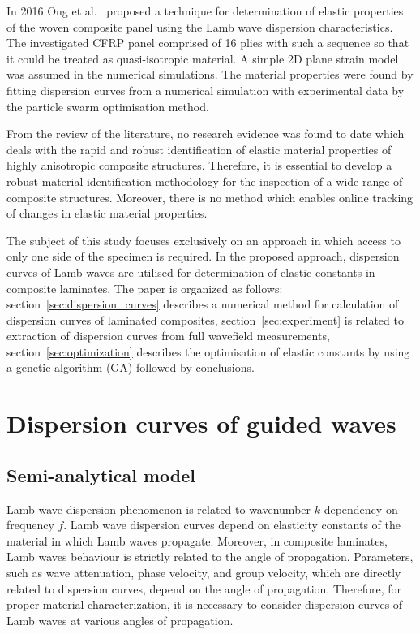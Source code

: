 	In 2016 Ong et al.~\cite{Ong2016} proposed a technique for determination of elastic properties of the woven composite panel using the Lamb wave dispersion characteristics. The investigated CFRP panel comprised of 16 plies with such a sequence so that it could be treated as quasi-isotropic material. A simple 2D plane strain model was assumed in the numerical simulations. The material properties were found by fitting dispersion curves from a numerical simulation with experimental data by the particle swarm optimisation method. 
	
	From the review of the literature, no research evidence was found to date which deals with the rapid and robust identification of elastic material properties of highly anisotropic composite structures. Therefore, it is essential to develop a robust material identification methodology for the inspection of a wide range of composite structures. Moreover, there is no method which enables online tracking of changes in elastic material properties.
	
	The subject of this study focuses exclusively on an approach in which access to only one side of the specimen is required. In the proposed approach, dispersion curves of Lamb waves are utilised for determination of elastic constants in composite laminates. The paper is organized as follows: section~\ref{sec:dispersion_curves} describes a numerical method for calculation of dispersion curves of laminated composites, section~\ref{sec:experiment} is related to extraction of dispersion curves from full wavefield measurements, section~\ref{sec:optimization} describes the optimisation of elastic constants by using a genetic algorithm (GA) followed by conclusions.
	
\section{Dispersion curves of guided waves \label{sec:dispersion_curves}}

\subsection{Semi-analytical model}
Lamb wave dispersion phenomenon is related to wavenumber \(k\) dependency on frequency \(f\). 
Lamb wave dispersion curves depend on elasticity constants of the material in which Lamb waves propagate. 
Moreover, in composite laminates, Lamb waves behaviour is strictly related to the angle of propagation. 
Parameters, such as wave attenuation, phase velocity, and group velocity, which are directly related to dispersion curves, depend on the angle of propagation. 
Therefore, for proper material characterization, it is necessary to consider dispersion curves of Lamb waves at various angles of propagation.
	
